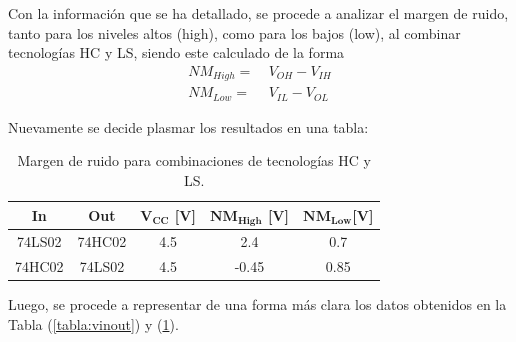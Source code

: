 Con la información que se ha detallado, se procede a analizar el margen de ruido, tanto para los niveles altos (high), como para los bajos (low), al combinar tecnologías HC y LS, siendo este calculado de la forma
\begin{equation*}
\begin{aligned}
		NM_{High}=\ & V_{OH} - V_{IH} \\
		NM_{Low}=\ & V_{IL} - V_{OL} 
\end{aligned}
\end{equation*}

Nuevamente se decide plasmar los resultados en una tabla:
\begin{table}[H]
\centering
\begin{tabular}{ccccc}
\hline
\textbf{In} & \textbf{Out} & $\mathbf{V_{CC}}$ \textbf{[V]} & $\mathbf{NM_{High}}$ \textbf{[V]} & $\mathbf{NM_{Low}} $\textbf{[V]} \\ \hline
74LS02      & 74HC02       & 4.5                            & 2.4                               & 0.7                              \\ 
74HC02      & 74LS02       & 4.5                              & -0.45                               & 0.85                                \\ \hline
\end{tabular}
\caption{Margen de ruido para combinaciones de tecnologías HC y LS.}
\label{tabla:nm}
\end{table}

Luego, se procede a representar de una forma más clara los datos obtenidos en la Tabla (\ref{tabla:vinout}) y (\ref{tabla:nm}).  


